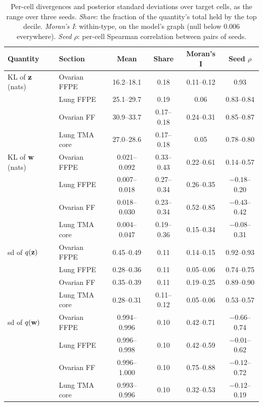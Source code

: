 \begin{table}[t]
\centering
\caption{Per-cell divergences and posterior standard deviations over target cells, as the range over three seeds. \emph{Share}: the fraction of the quantity's total held by the top decile. \emph{Moran's I}: within-type, on the model's graph (null below $0.006$ everywhere). \emph{Seed $\rho$}: per-cell Spearman correlation between pairs of seeds.}
\label{tab:kl-summary}
\small
\setlength{\tabcolsep}{4pt}
\begin{tabular}{@{}llcccc@{}}
\toprule
Quantity & Section & Mean & Share & Moran's I & Seed $\rho$ \\
\midrule
KL of $\mathbf{z}$ (nats) & Ovarian FFPE & 16.2--18.1 & 0.18 & 0.11--0.12 & 0.93 \\
 & Lung FFPE & 25.1--29.7 & 0.19 & 0.06 & 0.83--0.84 \\
 & Ovarian FF & 30.9--33.7 & 0.17--0.18 & 0.24--0.31 & 0.85--0.87 \\
 & Lung TMA core & 27.0--28.6 & 0.17--0.18 & 0.05 & 0.78--0.80 \\
\midrule
KL of $\mathbf{w}$ (nats) & Ovarian FFPE & 0.021--0.092 & 0.33--0.43 & 0.22--0.61 & 0.14--0.57 \\
 & Lung FFPE & 0.007--0.018 & 0.27--0.34 & 0.26--0.35 & $-0.18$--0.20 \\
 & Ovarian FF & 0.018--0.030 & 0.23--0.34 & 0.52--0.85 & $-0.43$--0.42 \\
 & Lung TMA core & 0.004--0.047 & 0.19--0.36 & 0.15--0.34 & $-0.08$--0.31 \\
\midrule
sd of $q(\mathbf{z})$ & Ovarian FFPE & 0.45--0.49 & 0.11 & 0.14--0.15 & 0.92--0.93 \\
 & Lung FFPE & 0.28--0.36 & 0.11 & 0.05--0.06 & 0.74--0.75 \\
 & Ovarian FF & 0.35--0.39 & 0.11 & 0.19--0.25 & 0.89--0.90 \\
 & Lung TMA core & 0.28--0.31 & 0.11--0.12 & 0.05--0.06 & 0.53--0.57 \\
\midrule
sd of $q(\mathbf{w})$ & Ovarian FFPE & 0.994--0.996 & 0.10 & 0.42--0.71 & $-0.66$--0.74 \\
 & Lung FFPE & 0.996--0.998 & 0.10 & 0.42--0.59 & $-0.01$--0.62 \\
 & Ovarian FF & 0.996--1.000 & 0.10 & 0.75--0.88 & $-0.12$--0.72 \\
 & Lung TMA core & 0.993--0.996 & 0.10 & 0.32--0.53 & $-0.12$--0.19 \\
\bottomrule
\end{tabular}
\end{table}

